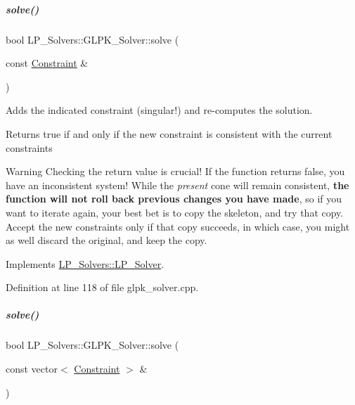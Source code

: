\mbox{\label{group___c_l_s_solvers_a544cb09dfa211fae9adaacfd402af9a2}} 
\subparagraph{\texorpdfstring{solve()}{solve()}\hspace{0.1cm}{\footnotesize\ttfamily [1/2]}}
{\footnotesize\ttfamily bool L\+P\+\_\+\+Solvers\+::\+G\+L\+P\+K\+\_\+\+Solver\+::solve (\begin{DoxyParamCaption}\item[{const \hyperlink{group___c_l_s_solvers_class_l_p___solvers_1_1_constraint}{Constraint} \&}]{ }\end{DoxyParamCaption})\hspace{0.3cm}{\ttfamily [virtual]}}



Adds the indicated constraint (singular!) and re-\/computes the solution. 

\begin{DoxyReturn}{Returns}
{\ttfamily true} if and only if the new constraint is consistent with the current constraints
\end{DoxyReturn}
\begin{DoxyWarning}{Warning}
Checking the return value is crucial! If the function returns {\ttfamily false}, you have an inconsistent system! While the {\itshape present} cone will remain consistent, {\bfseries the function will not roll back previous changes you have made}, so if you want to iterate again, your best bet is to copy the skeleton, and try that copy. Accept the new constraints only if that copy succeeds, in which case, you might as well discard the original, and keep the copy. 
\end{DoxyWarning}


Implements \hyperlink{group___c_l_s_solvers_a8b9979fb228ac9ccfe037ad6ca48b314}{L\+P\+\_\+\+Solvers\+::\+L\+P\+\_\+\+Solver}.



Definition at line 118 of file glpk\+\_\+solver.\+cpp.

\mbox{\label{group___c_l_s_solvers_a1ceccb6fc4eff73cc4237c46ab9e7699}} 
\subparagraph{\texorpdfstring{solve()}{solve()}\hspace{0.1cm}{\footnotesize\ttfamily [2/2]}}
{\footnotesize\ttfamily bool L\+P\+\_\+\+Solvers\+::\+G\+L\+P\+K\+\_\+\+Solver\+::solve (\begin{DoxyParamCaption}\item[{const vector$<$ \hyperlink{group___c_l_s_solvers_class_l_p___solvers_1_1_constraint}{Constraint} $>$ \&}]{ }\end{DoxyParamCaption})\hspace{0.3cm}{\ttfamily [virtual]}}



